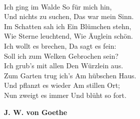 \documentclass[a4paper, 11pt, oneside]{Thesis}  %
\begin{document}
\onehalfspacing
\setcounter{page}{0}
\newpage



\frontmatter      %



\fancyhead{}  %
\rhead{}  %
\lhead{}  %
\rhead{\thepage }

\pagestyle{fancy}  %



\pagestyle{empty}  %
\cleardoublepage
~\newpage
\epigraph{
Ich ging im Walde 
So f\"ur mich hin, \\
Und nichts zu suchen, 
Das war mein Sinn.\\
[0.15cm]
Im Schatten sah ich 
Ein Blümchen stehn, \\
Wie Sterne leuchtend, 
Wie \"Auglein schön.\\
[0.15cm]
Ich wollt es brechen, 
Da sagt es fein: \\
Soll ich zum Welken 
Gebrochen sein?\\
[0.15cm]
Ich grub's mit allen 
Den Würzlein aus. \\
Zum Garten trug ich's 
Am h\"ubschen Haus. \\
[0.15cm]
Und pflanzt es wieder 
Am stillen Ort; \\
Nun zweigt es immer 
Und bl\"uht so fort.
}
{\textbf{J. W. von Goethe}}

%
\vfill\vfill\vfill\vfill\vfill\vfill\null
\clearpage  %

\newpage

\afterpage{\blankpage}
\end{document}
